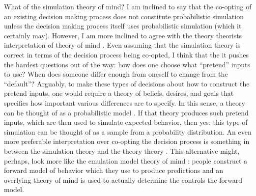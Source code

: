 \documentclass[12pt]{article}
\begin{document}
What of the simulation theory of mind? I am inclined to say that the co-opting of an existing decision making process does not constitute probabilistic simulation unless the decision making process itself uses probabilistic simulation (which it certainly may). However, I am more inclined to agree with the theory theorists interpretation of theory of mind \citep{Gopnik1992}. Even assuming that the simulation theory is correct in terms of the decision process being co-opted, I think that the it pushes the hardest questions out of the way: how does one choose what ``pretend'' inputs to use? When does someone differ enough from oneself to change from the ``default''? Arguably, to make these types of decisions about how to construct the pretend inputs, one would require a theory of beliefs, desires, and goals that specifies how important various differences are to specify. In this sense, a theory can be thought of as a probabilistic model \citep{Griffiths2009,Baker2014}. If that theory produces such pretend inputs, which are then used to simulate expected behavior, then yes: this type of simulation can be thought of as a sample from a probability distribution. An even more preferable interpretation over co-opting the decision process is something in between the simulation theory and the theory theory \citep{Saxe2005}. This alternative might, perhaps, look more like the emulation model theory of mind \citep{Grush2004}: people construct a forward model of behavior which they use to produce predictions and an overlying theory of mind is used to actually determine the controls the forward model.

\end{document}
